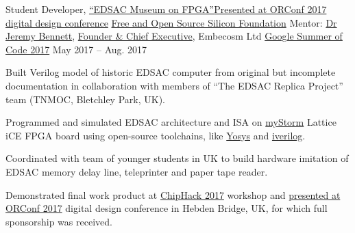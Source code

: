 \begin{cvexperience}
\cvposition
	{Student Developer, \href{https://github.com/librecores/gsoc-museum-edsac}{``EDSAC Museum on FPGA''}\quad\textbar\quad \href{https://orconf.org/2017/\#edsac}{Presented at ORConf 2017 digital design conference}} %
	{\href{https://fossi-foundation.org}{Free and Open Source Silicon Foundation}} %
	{Mentor: \href{http://www.jeremybennett.com}{Dr Jeremy Bennett}, \href{https://www.embecosm.com/about/meet-the-team/jeremy-bennett/}{Founder \& Chief Executive}, Embecosm Ltd} %
	{\href{https://summerofcode.withgoogle.com/archive/2017/projects/6470218444439552/}{Google Summer of Code 2017}} %
	{May 2017 -- Aug. 2017  {\acvHeaderIconSep{}} {} } %
	{\begin{cvitems} %
		\item {Built Verilog model of historic EDSAC computer from original but incomplete documentation in collaboration with members of ``The EDSAC Replica Project'' team (TNMOC, Bletchley Park, UK).}
		\item {Programmed and simulated EDSAC architecture and ISA on \href{https://mystorm.uk/}{myStorm} Lattice iCE FPGA board using open-source toolchains, like \href{http://www.clifford.at/yosys/}{Yosys} and \href{http://iverilog.icarus.com}{iverilog}.}
		\item {Coordinated with team of younger students in UK to build hardware imitation of EDSAC memory delay line, teleprinter and paper tape reader.}
		\item {Demonstrated final work product at \href{http://chiphack.org/chiphack-2017.html}{ChipHack 2017} workshop and \href{https://youtu.be/EZkJOyOcYiY}{presented at ORConf 2017} digital design conference in Hebden Bridge, UK, for which full sponsorship was received.}
	\end{cvitems}}


\end{cvexperience}

